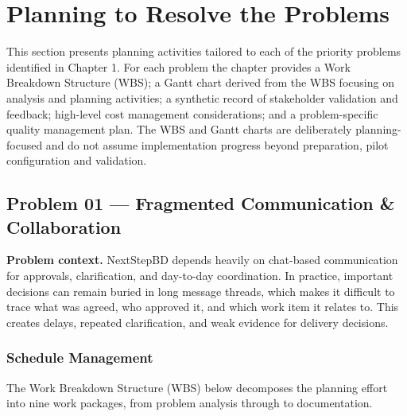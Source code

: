 \documentclass[12pt,a4paper]{report}
\begin{document}
\section{Planning to Resolve the Problems}
This section presents planning activities tailored to each of the priority problems identified in Chapter 1. For each problem the chapter provides a Work Breakdown Structure (WBS); a Gantt chart derived from the WBS focusing on analysis and planning activities; a synthetic record of stakeholder validation and feedback; high-level cost management considerations; and a problem-specific quality management plan. The WBS and Gantt charts are deliberately planning-focused and do not assume implementation progress beyond preparation, pilot configuration and validation.

\subsection{Problem 01 --- Fragmented Communication \& Collaboration}

\textbf{Problem context.} NextStepBD depends heavily on chat-based communication for approvals, clarification, and day-to-day coordination. In practice, important decisions can remain buried in long message threads, which makes it difficult to trace what was agreed, who approved it, and which work item it relates to. This creates delays, repeated clarification, and weak evidence for delivery decisions.

\subsubsection{Schedule Management}
The Work Breakdown Structure (WBS) below decomposes the planning effort into nine work packages, from problem analysis through to documentation.
\end{document}
